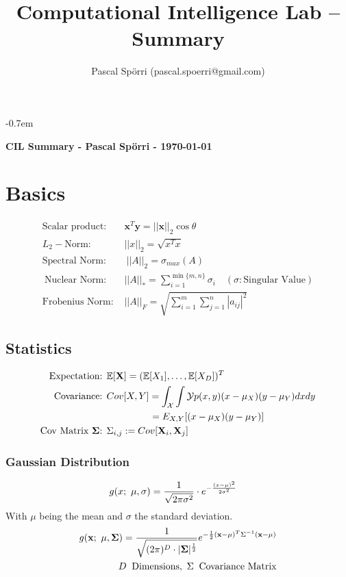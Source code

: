 \documentclass[a4paper,11pt,landscape]{article}
\title{Computational Intelligence Lab -- Summary}
\author{Pascal Spörri (pascal.spoerri@gmail.com)}
\newcommand{\sectionline}{\noindent\makebox[\linewidth]{\rule{\columnwidth}{0.1pt}}}
\begin{document}
\raggedright
\footnotesize
\setlength{\columnseprule}{0.1mm}
\abovedisplayskip=0pt
\belowdisplayskip=0cm
\allowdisplaybreaks
\itemsep-0.7em
 
\begin{multicols}{3}
\textbf{CIL Summary - Pascal Spörri - \today}
\vspace{-2mm}
\sectionline
\section{Basics}
\begin{align*}
 \text{Scalar product: }&\mathbf x^T \mathbf y = ||\mathbf x||_2 \cos \theta\\
 L_2-\text{Norm: } & ||x||_2 = \sqrt{x^Tx}\\
 \text{Spectral Norm: } &\ ||A||_2 = \sigma_{max}(A)\\\
 \text{Nuclear Norm: }& ||A||_* = \sum_{i=1}^{\min\{m,n\}} \sigma_i\quad (\sigma: \text{Singular Value})\\
 \text{Frobenius Norm: }& ||A||_F = \sqrt{\sum_{i=1}^m \sum_{j=1}^n |a_{ij}|^2}
\end{align*}

\vspace{-3mm}
\subsection{Statistics}
\begin{align*}
 \text{Expectation: }&\mathbb E[\mathbf X] = (\mathbb E[X_1], \ldots, \mathbb E[X_D])^T\\
 \text{Covariance: } &Cov[X,Y] = \int_{\mathcal X}\int{\mathcal Y} p(x,y)(x - \mu_X)(y - \mu_Y) dxdy\\
 &\qquad \qquad \, \ = \mathbb \mathcal E_{X,Y}[(x-\mu_X)(y-\mu_Y)]\\
 \text{Cov Matrix $\mathbf \Sigma$: } & \Sigma_{i,j} := Cov[\mathbf X_i, \mathbf X_j]
\end{align*}

\subsubsection{Gaussian Distribution}
\vspace{-2mm}
\begin{align*}
 g(x;\ \mu,\sigma) &= {1\over \sqrt{2\pi \sigma^2}} \cdot e^{- {(x-\mu)^2 \over 2 \sigma^2}}
\end{align*}
With $\mu$ being the mean and $\sigma$ the standard deviation.
\begin{align*}
 g(\mathbf x;\ \mathbf \mu, \mathbf \Sigma) = {1\over \sqrt{(2\pi)^D \cdot |\mathbf \Sigma|^{1\over 2}}} e^{-\frac{1}{2} (\mathbf x - \mathbf \mu)^T  \Sigma^{-1}  (\mathbf x - \mathbf \mu)}\\
 D\:\ \text{Dimensions},\ \Sigma\:\ \text{Covariance Matrix}
\end{align*}

\end{multicols}
\end{document}
